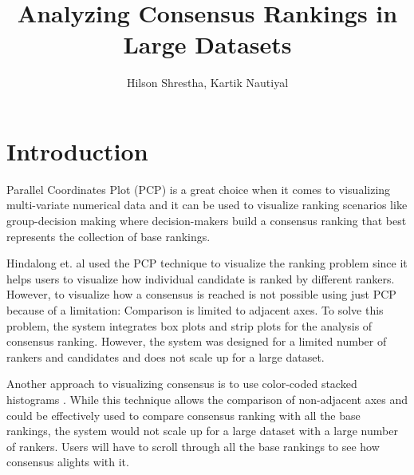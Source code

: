 \documentclass{proc}
\begin{document}
\title{Analyzing Consensus Rankings in Large Datasets}

\author{Hilson Shrestha, Kartik Nautiyal}

\maketitle


\section{Introduction}


Parallel Coordinates Plot (PCP) is a great choice when it comes to visualizing multi-variate numerical data and it can be used to visualize ranking scenarios like group-decision making where decision-makers build a consensus ranking that best represents the collection of base rankings.

Hindalong et. al \cite{hindalong2020towards} used the PCP technique to visualize the ranking problem since it helps users to visualize how individual candidate is ranked by different rankers. However, to visualize how a consensus is reached is not possible using just PCP because of a limitation: Comparison is limited to adjacent axes. To solve this problem, the system integrates box plots and strip plots for the analysis of consensus ranking. However, the system was designed for a limited number of rankers and candidates and does not scale up for a large dataset.

Another approach to visualizing consensus is to use color-coded stacked histograms \cite{bok2020augmenting}. While this technique allows the comparison of non-adjacent axes and could be effectively used to compare consensus ranking with all the base rankings, the system would not scale up for a large dataset with a large number of rankers. Users will have to scroll through all the base rankings to see how consensus alights with it.
\end{document}
